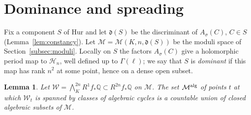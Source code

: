\documentclass[11pt]{amsart}
\newtheorem{lemma}[theorem]{Lemma}
\theoremstyle{definition}
\theoremstyle{remark}
\newcommand{\Q}{\mathbb Q}
\newcommand{\cH}{\mathrm{Hur}}
\newcommand{\cHn}{\mathcal H_n}
\newcommand{\cM}{\mathcal M}
\newcommand{\fd}{\mathfrak d}
\begin{document}
\section{Dominance and spreading}\label{sec:spread}

Fix a component $S$ of $\cH$ and let $\fd(S)$ be the discriminant of $A_\sigma(C)$, $C\in S$ (Lemma~\ref{lem:constancy}). Let $\cM=\cM(K,n,\fd(S))$ be the moduli space of Section~\ref{subsec:moduli}. Locally on $S$ the factors $A_\sigma(C)$ give a holomorphic period map to $\cHn$, well defined up to $\Gamma(\ell)$; we say that $S$ is \emph{dominant} if this map has rank $n^2$ at some point, hence on a dense open subset.

\begin{lemma}\label{lem:locus}
Let $\mathcal W=\bigwedge^{2n}_KR^1f_*\Q\subset R^{2n}f_*\Q$ on $\cM$. The set $\cM^{\rm alg}$ of points $t$ at which $\mathcal W_t$ is spanned by classes of algebraic cycles is a countable union of closed algebraic subsets of $\cM$.
\end{lemma}
\end{document}
